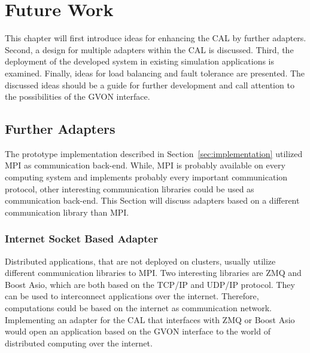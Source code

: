 \chapter{Future Work}
\label{sec:futurework}

This chapter will first introduce ideas for enhancing the CAL by further
adapters. Second, a design for multiple adapters within the CAL is discussed. Third, the
deployment of the developed system in existing simulation applications is examined.
Finally, ideas for load balancing and fault tolerance are presented. The discussed ideas
should be a guide for further development and call attention to the possibilities
of the GVON interface.

\section*{Further Adapters}

The prototype implementation described in
Section~\ref{sec:implementation} utilized MPI as communication
back-end. While, MPI is probably available on every computing system
and implements probably every important communication protocol, other
interesting communication libraries could be used as communication
back-end.  This Section will discuss adapters based on a different
communication library than MPI.

\subsection*{Internet Socket Based Adapter}

Distributed applications, that are not deployed on clusters,
usually utilize different communication libraries to MPI. Two
interesting libraries are ZMQ and Boost Asio, which are both based
on the TCP/IP and UDP/IP protocol. They can be used to
interconnect applications over the internet. Therefore,
computations could be based on the internet as communication
network. Implementing an adapter for the CAL that interfaces with
ZMQ or Boost Asio would open an application based on the GVON interface
to the world of distributed computing over the internet.


